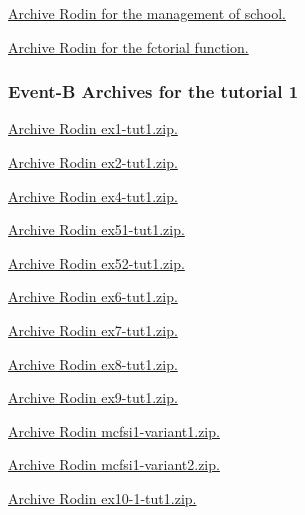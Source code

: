\documentclass[ 12pt]{article}
\begin{document}
 
 \href{http://mery54.github.io/teaching/mosos/lecturesnotes/
   ex-school.zip}{Archive Rodin  for   the management of school. }
  

 
 \href{http://mery54.github.io/teaching/mosos/lecturesnotes/
   ex0-factorial.zip}{Archive Rodin  for   the fctorial function. }
  


 \subsubsection{Event-B Archives for   the tutorial 1}
\label{sec:event-b-archives}



\href{http://mery54.github.io/teaching/mosos/models/ex1-tut1.zip}{Archive
  Rodin   ex1-tut1.zip.}

\href{http://mery54.github.io/teaching/mosos/models/ex2-tut1.zip}{Archive 
  Rodin   ex2-tut1.zip.}

\href{http://mery54.github.io/teaching/mosos/models/ex4-tut1.zip}{Archive 
  Rodin   ex4-tut1.zip.}


\href{http://mery54.github.io/teaching/mosos/models/ex51-tut1.zip}{Archive 
  Rodin   ex51-tut1.zip.}

\href{http://mery54.github.io/teaching/mosos/models/ex52-tut1.zip}{Archive 
  Rodin   ex52-tut1.zip.}



\href{http://mery54.github.io/teaching/mosos/models/ex6-tut1.zip}{Archive 
  Rodin   ex6-tut1.zip.}



\href{http://mery54.github.io/teaching/mosos/models/ex7-tut1.zip}{Archive 
  Rodin   ex7-tut1.zip.}


\href{http://mery54.github.io/teaching/mosos/models/ex8-tut1.zip}{Archive 
  Rodin   ex8-tut1.zip.}


\href{http://mery54.github.io/teaching/mosos/models/ex9-tut1.zip}{Archive 
  Rodin   ex9-tut1.zip.}



\href{http://mery54.github.io/teaching/mosos/models/mcfsi1-variant1.zip}{Archive 
  Rodin   mcfsi1-variant1.zip.}

\href{http://mery54.github.io/teaching/mosos/models/mcfsi1-variant2.zip}{Archive 
  Rodin   mcfsi1-variant2.zip.}


\href{http://mery54.github.io/teaching/mosos/models/ex10-1-tut1.zip}{Archive 
  Rodin   ex10-1-tut1.zip.}
\end{document}
